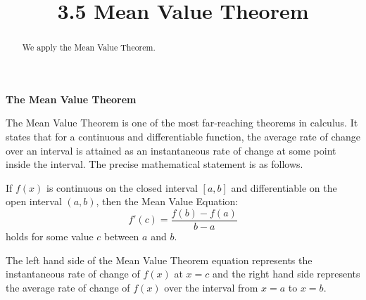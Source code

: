 \documentclass{ximera}
\title{3.5 Mean Value Theorem}
\begin{document}
\begin{abstract}
We apply the Mean Value Theorem.
\end{abstract}

\maketitle

\begin{center}
\textbf{The Mean Value Theorem}
\end{center}


The Mean Value Theorem is one of the most far-reaching theorems in calculus. It states that for a continuous 
and differentiable function, the average rate of change over an interval is attained as an 
instantaneous rate of change at some point inside the interval. The precise mathematical statement is as follows.\\

\begin{theorem}
If $f(x)$ is continuous on the closed interval $[a,b]$ and differentiable on the 
open interval $(a,b)$, then the Mean Value Equation:
\[f'(c) = \frac{f(b) - f(a)}{b-a}\]
holds for some value $c$ between $a$ and $b$.\\
\end{theorem}




The left hand side of the Mean Value Theorem equation represents the instantaneous rate of change of $f(x)$ at $x = c$ and the
right hand side represents the average rate of change of $f(x)$ over the interval from $x=a$ to $x=b$.

\begin{image}
\end{image}
\end{document}
